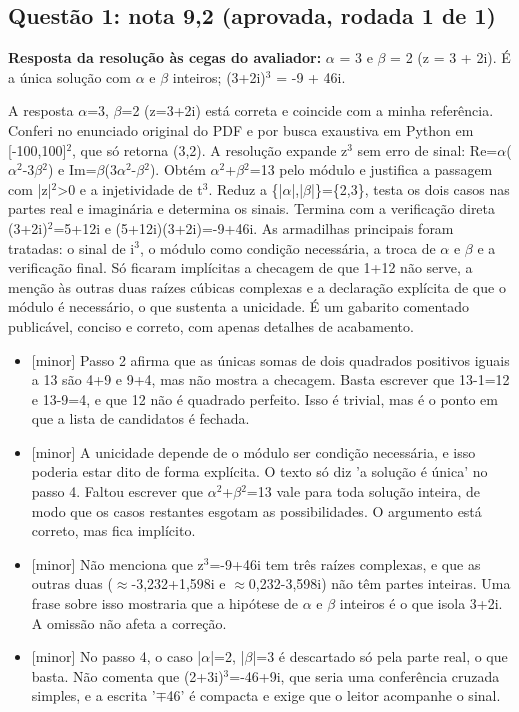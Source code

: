 \documentclass{article}%
\begin{document}
\subsection*{Questão 1: nota 9,2 (aprovada, rodada 1 de 1)}%
\textbf{Resposta da resolução às cegas do avaliador:} $\alpha$ = 3 e $\beta$ = 2 (z = 3 + 2i). É a única solução com $\alpha$ e $\beta$ inteiros; (3+2i)$^3$ = -9 + 46i.\par %
A resposta $\alpha$=3, $\beta$=2 (z=3+2i) está correta e coincide com a minha referência. Conferi no enunciado original do PDF e por busca exaustiva em Python em {[}-100,100{]}$^2$, que só retorna (3,2). A resolução expande z$^3$ sem erro de sinal: Re=$\alpha$($\alpha$$^2$-3$\beta$$^2$) e Im=$\beta$(3$\alpha$$^2$-$\beta$$^2$). Obtém $\alpha$$^2$+$\beta$$^2$=13 pelo módulo e justifica a passagem com |z|$^2$>0 e a injetividade de t$^3$. Reduz a \{|$\alpha$|,|$\beta$|\}=\{2,3\}, testa os dois casos nas partes real e imaginária e determina os sinais. Termina com a verificação direta (3+2i)$^2$=5+12i e (5+12i)(3+2i)=-9+46i. As armadilhas principais foram tratadas: o sinal de i$^3$, o módulo como condição necessária, a troca de $\alpha$ e $\beta$ e a verificação final. Só ficaram implícitas a checagem de que 1+12 não serve, a menção às outras duas raízes cúbicas complexas e a declaração explícita de que o módulo é necessário, o que sustenta a unicidade. É um gabarito comentado publicável, conciso e correto, com apenas detalhes de acabamento.%
\begin{itemize}%
\item%
{[}minor{]} Passo 2 afirma que as únicas somas de dois quadrados positivos iguais a 13 são 4+9 e 9+4, mas não mostra a checagem. Basta escrever que 13-1=12 e 13-9=4, e que 12 não é quadrado perfeito. Isso é trivial, mas é o ponto em que a lista de candidatos é fechada.%
\item%
{[}minor{]} A unicidade depende de o módulo ser condição necessária, e isso poderia estar dito de forma explícita. O texto só diz 'a solução é única' no passo 4. Faltou escrever que $\alpha$$^2$+$\beta$$^2$=13 vale para toda solução inteira, de modo que os casos restantes esgotam as possibilidades. O argumento está correto, mas fica implícito.%
\item%
{[}minor{]} Não menciona que z$^3$=-9+46i tem três raízes complexas, e que as outras duas ($\approx$-3,232+1,598i e $\approx$0,232-3,598i) não têm partes inteiras. Uma frase sobre isso mostraria que a hipótese de $\alpha$ e $\beta$ inteiros é o que isola 3+2i. A omissão não afeta a correção.%
\item%
{[}minor{]} No passo 4, o caso |$\alpha$|=2, |$\beta$|=3 é descartado só pela parte real, o que basta. Não comenta que (2+3i)$^3$=-46+9i, que seria uma conferência cruzada simples, e a escrita '$\mp$46' é compacta e exige que o leitor acompanhe o sinal.%
\end{itemize}%
\end{document}
